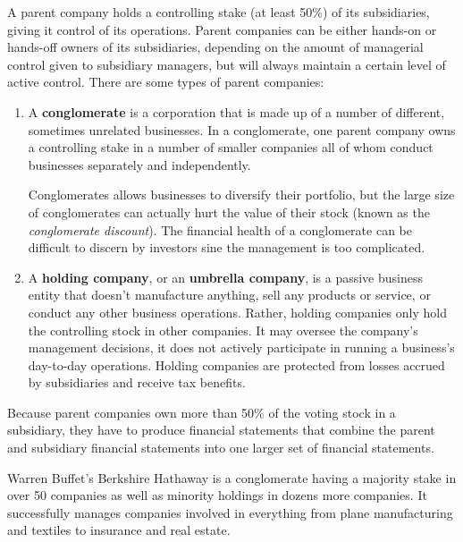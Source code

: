 \documentclass{article}
\begin{document}
    \begin{definition}
      A parent company holds a controlling stake (at least 50\%) of its subsidiaries, giving it control of its operations. Parent companies can be either hands-on or hands-off owners of its subsidiaries, depending on the amount of managerial control given to subsidiary managers, but will always maintain a certain level of active control. There are some types of parent companies:
      \begin{enumerate}
        \item A \textbf{conglomerate} is a corporation that is made up of a number of different, sometimes unrelated businesses. In a conglomerate, one parent company owns a controlling stake in a number of smaller companies all of whom conduct businesses separately and independently. 
        
        Conglomerates allows businesses to diversify their portfolio, but the large size of conglomerates can actually hurt the value of their stock (known as the \textit{conglomerate discount}). The financial health of a conglomerate can be difficult to discern by investors sine the management is too complicated. 
        \item A \textbf{holding company}, or an \textbf{umbrella company}, is a passive business entity that doesn't manufacture anything, sell any products or service, or conduct any other business operations. Rather, holding companies only hold the controlling stock in other companies. It may oversee the company's management decisions, it does not actively participate in running a business's day-to-day operations. Holding companies are protected from losses accrued by subsidiaries and receive tax benefits.
      \end{enumerate}
      Because parent companies own more than 50\% of the voting stock in a subsidiary, they have to produce financial statements that combine the parent and subsidiary financial statements into one larger set of financial statements. 
    \end{definition}

    \begin{example}
      Warren Buffet's Berkshire Hathaway is a conglomerate having a majority stake in over 50 companies as well as minority holdings in dozens more companies. It successfully manages companies involved in everything from plane manufacturing and textiles to insurance and real estate. 
    \end{example}
\end{document}

